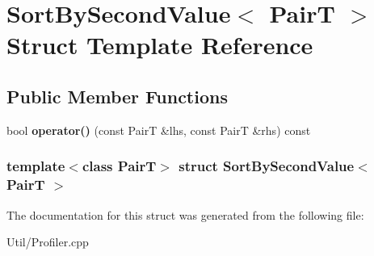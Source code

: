 \hypertarget{struct_sort_by_second_value}{\section{\-Sort\-By\-Second\-Value$<$ \-Pair\-T $>$ \-Struct \-Template \-Reference}
\label{struct_sort_by_second_value}
}
\subsection*{\-Public \-Member \-Functions}
\begin{DoxyCompactItemize}
\item 
\hypertarget{struct_sort_by_second_value_ab275494b78541d6c37f54597d4824980}{bool {\bfseries operator()} (const \-Pair\-T \&lhs, const \-Pair\-T \&rhs) const }\label{struct_sort_by_second_value_ab275494b78541d6c37f54597d4824980}

\end{DoxyCompactItemize}
\subsubsection*{template$<$class Pair\-T$>$ struct Sort\-By\-Second\-Value$<$ Pair\-T $>$}



\-The documentation for this struct was generated from the following file\-:\begin{DoxyCompactItemize}
\item 
\-Util/\-Profiler.\-cpp\end{DoxyCompactItemize}
